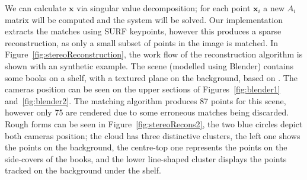 \documentclass[12pt]{article}
\begin{document}
We can calculate $\mathbf{x}$ via singular value decomposition; for each point $\mathbf{x}_i$ a new $A_i$ matrix will be computed and the system will be solved.
Our implementation extracts the matches using SURF keypoints, however this produces a sparse reconstruction, as only a small subset of points in the image is matched.
In Figure~\ref{fig:stereoReconstruction}, the work flow of the reconstruction algorithm is shown with an synthetic example.
The scene (modelled using Blender) contains some books on a shelf, with a textured plane on the background, based on \cite{Archemi2014}.
The cameras position can be seen on the upper sections of Figures~\ref{fig:blender1} and~\ref{fig:blender2}.
The matching algorithm produces 87 points for this scene, however only 75 are rendered due to some erroneous matches being discarded.
Rough forms can be seen in Figure~\ref{fig:stereoRecons2}, the two blue circles depict both cameras position; the cloud has three distinctive clusters, the left one shows the points on the background, the centre-top one represents the points on the side-covers of the books, and the lower line-shaped cluster displays the points tracked on the background under the shelf.
\end{document}
